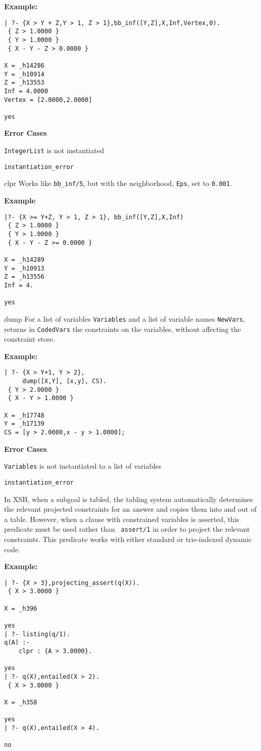 \begin{description}
{\bf Example:}
{\small
\begin{verbatim}
| ?- {X > Y + Z,Y > 1, Z > 1},bb_inf([Y,Z],X,Inf,Vertex,0).
 { Z > 1.0000 }
 { Y > 1.0000 }
 { X - Y - Z > 0.0000 }

X = _h14286
Y = _h10914
Z = _h13553
Inf = 4.0000
Vertex = [2.0000,2.0000]

yes
\end{verbatim}
}
%
{\bf Error Cases}
\bi
\item 	{\tt IntegerList} is not instantiated
\bi
\item 	{\tt instantiation\_error}
\ei
\ei

  {clpr}
%
Works like {\tt bb\_inf/5}, but with the neighborhood, {\tt Eps}, set
to {\tt 0.001}.

{\bf Example}
{\small
\begin{verbatim}
|?- {X >= Y+Z, Y > 1, Z > 1}, bb_inf([Y,Z],X,Inf)
 { Z > 1.0000 }
 { Y > 1.0000 }
 { X - Y - Z >= 0.0000 }

X = _h14289
Y = _h10913
Z = _h13556
Inf = 4.

yes
\end{verbatim}
}

 {dump} 
%
For a list of variables {\tt Variables} and a list of variable names
{\tt NewVars}, returns in {\tt CodedVars} the constraints on the
variables, without affecting the constraint store.

{\bf Example:}
{\small
\begin{verbatim}
| ?- {X > Y+1, Y > 2},
     dump([X,Y], [x,y], CS).
 { Y > 2.0000 }
 { X - Y > 1.0000 }

X = _h17748
Y = _h17139
CS = [y > 2.0000,x - y > 1.0000];
\end{verbatim}
}
%
{\bf Error Cases}
\bi
\item 	{\tt Variables} is not instantiated to a list of variables
\bi
\item 	{\tt instantiation\_error}
\ei
\ei

%
In XSB, when a subgoal is tabled, the tabling system automatically
determines the relevant projected constraints for an answer and copies
them into and out of a table.  However, when a clause with constrained
variables is asserted, this predicate must be used rather than {\tt
  assert/1} in order to project the relevant constraints.  This
predicate works with either standard or trie-indexed dynamic code.

{\bf Example:}
{\small
\begin{verbatim}
| ?- {X > 3},projecting_assert(q(X)).
 { X > 3.0000 }

X = _h396

yes
| ?- listing(q/1).
q(A) :-
    clpr : {A > 3.0000}.

yes
| ?- q(X),entailed(X > 2).
 { X > 3.0000 }

X = _h358

yes
| ?- q(X),entailed(X > 4).

no
\end{verbatim}
}
\end{description}
